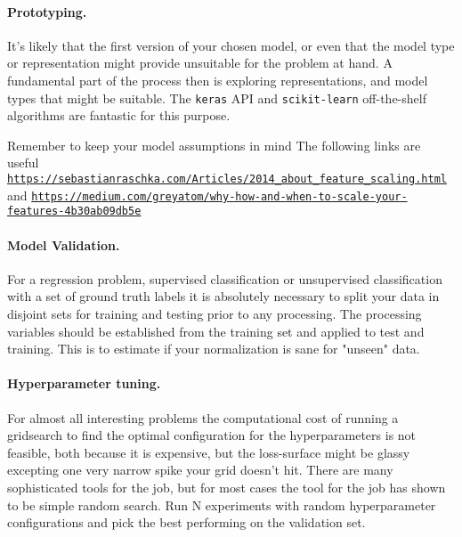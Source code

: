 \documentclass[%
oneside,                 %
final,                   %
10pt]{article}
\begin{document}
\paragraph{Prototyping.}
It's likely that the first version of your chosen model, or even that
the model type or representation might provide unsuitable for the
problem at hand. A fundamental part of the process then is exploring
representations, and model types that might be suitable. The \texttt{keras}
API and \texttt{scikit-learn} off-the-shelf algorithms are fantastic for this
purpose.

Remember to keep your model assumptions in mind
The following links are useful \href{{https://sebastianraschka.com/Articles/2014_about_feature_scaling.html}}{\nolinkurl{https://sebastianraschka.com/Articles/2014_about_feature_scaling.html}} and  \href{{https://medium.com/greyatom/why-how-and-when-to-scale-your-features-4b30ab09db5e}}{\nolinkurl{https://medium.com/greyatom/why-how-and-when-to-scale-your-features-4b30ab09db5e}}


\paragraph{Model Validation.}
For a regression problem, supervised classification or unsupervised
classification with a set of ground truth labels it is absolutely
necessary to split your data in disjoint sets for training and testing
prior to any processing. The processing variables should be
established from the training set and applied to test and
training. This is to estimate if your normalization is sane for
"unseen" data.

\paragraph{Hyperparameter tuning.}
For almost all interesting problems the computational cost of running
a gridsearch to find the optimal configuration for the hyperparameters
is not feasible, both because it is expensive, but the loss-surface
might be glassy excepting one very narrow spike your grid doesn't
hit. There are many sophisticated tools for the job, but for most
cases the tool for the job has shown to be simple random search. Run N
experiments with random hyperparameter configurations and pick the
best performing on the validation set.
\end{document}
